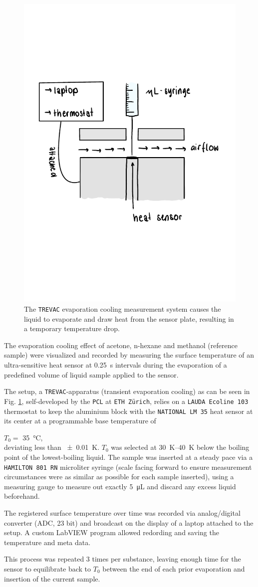 \begin{figure}[H]
    \centering
    \includegraphics[width=.5\textwidth]{figures/ddr_sketch_TREVAC.pdf}
    \caption{The \texttt{TREVAC} evaporation cooling measurement system causes the liquid to evaporate and draw heat from the sensor plate, resulting in a temporary temperature drop.}
    \label{fig:sketch_trevac}
\end{figure}


The evaporation cooling effect of acetone, n-hexane and methanol (reference sample) were visualized and recorded by measuring the surface temperature of an ultra-sensitive heat sensor at \qty{0.25}{\second} intervals during the evaporation of a predefined volume of liquid sample applied to the sensor.

The setup, a \texttt{TREVAC}-apparatus (transient evaporation cooling) as can be seen in Fig. \ref{fig:sketch_trevac}, self-developed by the \texttt{PCL} at \texttt{ETH Zürich}, relies on a \texttt{LAUDA Ecoline 103} thermostat to keep the aluminium block with the \texttt{NATIONAL LM 35} heat sensor at its center at a programmable base temperature of 

$T_0=$ \qty{35}{\celsius}, 
\\deviating less than \qty{\pm 0.01}{\kelvin}. $T_0$ was selected at \qtyrange{30}{40}{\kelvin} below the boiling point of the lowest-boiling liquid. The sample was inserted at a steady pace via a \texttt{HAMILTON 801 RN} microliter syringe (scale facing forward to ensure measurement circumstances were as similar as possible for each sample inserted), using a measuring gauge to measure out exactly \qty{5}{\micro\liter} and discard any excess liquid beforehand. 

The registered surface temperature over time was recorded via analog/digital converter (ADC, 23 bit) and broadcast on the display of a laptop attached to the setup. A custom LabVIEW program allowed redording and saving the temperature and meta data.

This process was repeated 3 times per substance, leaving enough time for the sensor to equilibrate back to $T_0$ between the end of each prior evaporation and insertion of the current sample.
